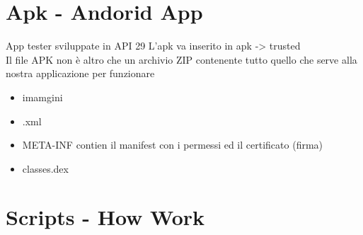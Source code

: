 \documentclass{article}
\begin{document}
\section{Apk - Andorid App}
App tester sviluppate in API 29
L'apk va inserito in apk -> trusted
\\Il file APK non è altro che un archivio ZIP contenente tutto quello che serve alla nostra applicazione per funzionare
\begin{itemize}
    \item imamgini
    \item .xml
    \item META-INF contien il manifest con i permessi ed il certificato (firma)
    \item classes.dex
\end{itemize}

\section{Scripts - How Work}
\end{document}
